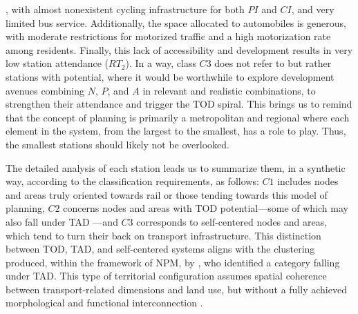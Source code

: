 \begin{refsegment}
{}, with almost nonexistent cycling infrastructure for both \(PI\) and \(CI\), and very limited bus service. Additionally, the space allocated to automobiles is generous, with moderate restrictions for motorized traffic and a high motorization rate among residents. Finally, this lack of accessibility and development results in very low station attendance (\(RT_{2}\)). In a way, class \(C3\) does not refer to  but rather stations with potential, where it would be worthwhile to explore development avenues combining \(N\), \(P\), and \(A\) in relevant and realistic combinations, to strengthen their attendance and trigger the \acrshort{TOD} spiral. This brings us to remind that the concept of planning is primarily a metropolitan and regional  where each element in the system, from the largest to the smallest, has a role to play. Thus, the smallest stations should likely not be overlooked.%

The detailed analysis of each station leads us to summarize them, in a synthetic way, according to the classification requirements, as follows: \(C1\) includes nodes and areas truly oriented towards rail or those tending towards this model of planning, \(C2\) concerns nodes and areas with \acrshort{TOD} potential—some of which may also fall under \acrshort{TAD} \textcolor{blue}{\autocite[3]{renne_transit-adjacent_2009}}—and \(C3\) corresponds to self-centered nodes and areas, which tend to turn their back on transport infrastructure. This distinction between \acrshort{TOD}, \acrshort{TAD}, and self-centered systems aligns with the clustering produced, within the framework of \acrshort{NPM}, by \textcolor{blue}{\textcite[271]{li_transit_2019}}, who identified a category falling under \acrshort{TAD}. This type of territorial configuration assumes spatial coherence between transport-related dimensions and land use, but without a fully achieved morphological and functional interconnection \textcolor{blue}{\autocite[47]{el_hadeuf_ville_2017}}.%


\end{refsegment}
